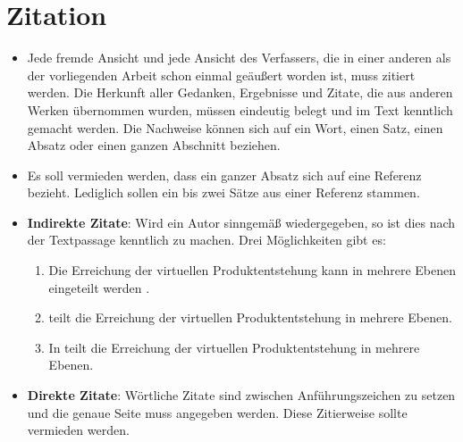 \section{Zitation}
\label{sec:zitation}
\begin{itemize}
    \item Jede fremde Ansicht und jede Ansicht des Verfassers, die in einer anderen als der vorliegenden Arbeit schon einmal geäußert worden ist, muss zitiert werden. Die Herkunft aller Gedanken, Ergebnisse und Zitate, die aus anderen Werken übernommen wurden, müssen eindeutig belegt und im Text kenntlich gemacht werden. Die Nachweise können sich auf ein Wort, einen Satz, einen Absatz oder einen ganzen Abschnitt beziehen.
    \item Es soll vermieden werden, dass ein ganzer Absatz sich auf eine Referenz bezieht. Lediglich sollen ein bis zwei Sätze aus einer Referenz stammen. 

    \item \textbf{Indirekte Zitate}: Wird ein Autor sinngemäß wiedergegeben, so ist dies nach der Textpassage kenntlich zu machen. Drei Möglichkeiten gibt es:

    \begin{enumerate}
        \item Die Erreichung der virtuellen Produktentstehung kann in mehrere Ebenen eingeteilt werden \cite{anderl_simulations}.
        \item \textcite{anderl_simulations} teilt die Erreichung der virtuellen Produktentstehung in mehrere Ebenen. 
        \item In \citeyear{anderl_simulations} teilt \cite{anderl_simulations} die Erreichung der virtuellen Produktentstehung in mehrere Ebenen.  
    \end{enumerate}
    \item \textbf{Direkte Zitate}: Wörtliche Zitate sind zwischen Anführungszeichen zu setzen und die genaue Seite muss angegeben werden. Diese Zitierweise sollte vermieden werden.
\end{itemize}


